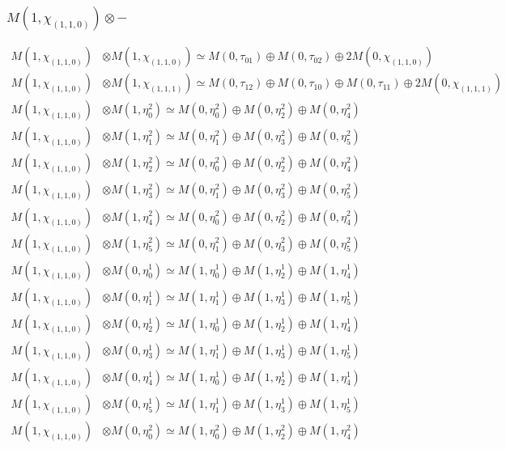 \subsubsection{$ M(1,\chi_{(1,1,0)})\otimes -$}
\begin{align*}
M(1,\chi_{(1,1,0)}) &\otimes M(1,\chi_{(1,1,0)}) \simeq M(0,\tau_{01}) \oplus M(0,\tau_{02}) \oplus 2 M(0,\chi_{(1,1,0)}) \\
M(1,\chi_{(1,1,0)}) &\otimes M(1,\chi_{(1,1,1)}) \simeq M(0,\tau_{12}) \oplus M(0,\tau_{10}) \oplus M(0,\tau_{11}) \oplus 2 M(0,\chi_{(1,1,1)}) \\
M(1,\chi_{(1,1,0)}) &\otimes M(1,\eta^{2}_{0}) \simeq M(0,\eta^{2}_{0}) \oplus M(0,\eta^{2}_{2}) \oplus M(0,\eta^{2}_{4}) \\
M(1,\chi_{(1,1,0)}) &\otimes M(1,\eta^{2}_{1}) \simeq M(0,\eta^{2}_{1}) \oplus M(0,\eta^{2}_{3}) \oplus M(0,\eta^{2}_{5}) \\
M(1,\chi_{(1,1,0)}) &\otimes M(1,\eta^{2}_{2}) \simeq M(0,\eta^{2}_{0}) \oplus M(0,\eta^{2}_{2}) \oplus M(0,\eta^{2}_{4}) \\
M(1,\chi_{(1,1,0)}) &\otimes M(1,\eta^{2}_{3}) \simeq M(0,\eta^{2}_{1}) \oplus M(0,\eta^{2}_{3}) \oplus M(0,\eta^{2}_{5}) \\
M(1,\chi_{(1,1,0)}) &\otimes M(1,\eta^{2}_{4}) \simeq M(0,\eta^{2}_{0}) \oplus M(0,\eta^{2}_{2}) \oplus M(0,\eta^{2}_{4}) \\
M(1,\chi_{(1,1,0)}) &\otimes M(1,\eta^{2}_{5}) \simeq M(0,\eta^{2}_{1}) \oplus M(0,\eta^{2}_{3}) \oplus M(0,\eta^{2}_{5}) \\
M(1,\chi_{(1,1,0)}) &\otimes M(0,\eta^{1}_{0}) \simeq M(1,\eta^{1}_{0}) \oplus M(1,\eta^{1}_{2}) \oplus M(1,\eta^{1}_{4}) \\
M(1,\chi_{(1,1,0)}) &\otimes M(0,\eta^{1}_{1}) \simeq M(1,\eta^{1}_{1}) \oplus M(1,\eta^{1}_{3}) \oplus M(1,\eta^{1}_{5}) \\
M(1,\chi_{(1,1,0)}) &\otimes M(0,\eta^{1}_{2}) \simeq M(1,\eta^{1}_{0}) \oplus M(1,\eta^{1}_{2}) \oplus M(1,\eta^{1}_{4}) \\
M(1,\chi_{(1,1,0)}) &\otimes M(0,\eta^{1}_{3}) \simeq M(1,\eta^{1}_{1}) \oplus M(1,\eta^{1}_{3}) \oplus M(1,\eta^{1}_{5}) \\
M(1,\chi_{(1,1,0)}) &\otimes M(0,\eta^{1}_{4}) \simeq M(1,\eta^{1}_{0}) \oplus M(1,\eta^{1}_{2}) \oplus M(1,\eta^{1}_{4}) \\
M(1,\chi_{(1,1,0)}) &\otimes M(0,\eta^{1}_{5}) \simeq M(1,\eta^{1}_{1}) \oplus M(1,\eta^{1}_{3}) \oplus M(1,\eta^{1}_{5}) \\
M(1,\chi_{(1,1,0)}) &\otimes M(0,\eta^{2}_{0}) \simeq M(1,\eta^{2}_{0}) \oplus M(1,\eta^{2}_{2}) \oplus M(1,\eta^{2}_{4}) \\

\end{align*}

